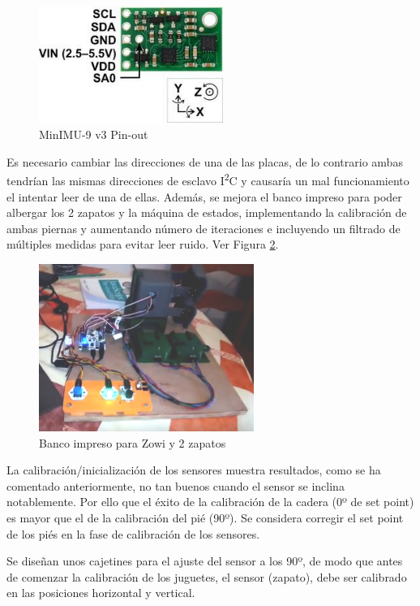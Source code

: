 \begin{figure}
\centering
\includegraphics[width=60mm]{Figures/minimu_sa0}
\caption[MinIMU-9 v3 Pin-out]{MinIMU-9 v3 Pin-out}
\label{fig:minimu_sa0}
\end{figure}

Es necesario cambiar las direcciones de una de las placas, de lo contrario ambas tendrían las mismas direcciones de esclavo I\textsuperscript{2}C y causaría un mal funcionamiento el intentar leer de una de ellas. Además, se mejora el banco impreso para poder albergar los 2 zapatos y la máquina de estados, implementando la calibración de ambas piernas y aumentando número de iteraciones e incluyendo un filtrado de múltiples medidas para evitar leer ruido. Ver Figura \ref{fig:banco_2zapato}.

\begin{figure}
\centering
\includegraphics[width=70mm]{Figures/banco_2zapato}
\caption[Banco 1 zapato]{Banco impreso para Zowi y 2 zapatos}
\label{fig:banco_2zapato}
\end{figure}

La calibración/inicialización de los sensores muestra resultados, como se ha comentado anteriormente, no tan buenos cuando el sensor se inclina notablemente. Por ello que el éxito de la calibración de la cadera (0º de set point) es mayor que el de la calibración del pié (90º). Se considera corregir el set point de los piés en la fase de calibración de los sensores.

Se diseñan unos cajetines para el ajuste del sensor a los 90º, de modo que antes de comenzar la calibración de los juguetes, el sensor (zapato), debe ser calibrado en las posiciones horizontal y vertical.

